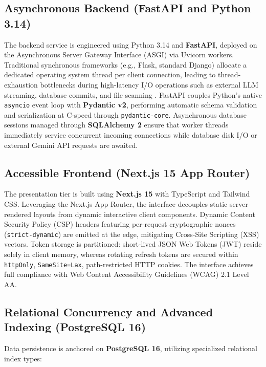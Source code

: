 \documentclass[conference]{IEEEtran}
\begin{document}
\subsection{Asynchronous Backend (FastAPI and Python 3.14)}
The backend service is engineered using Python 3.14 and \textbf{FastAPI}, deployed on the Asynchronous Server Gateway Interface (ASGI) via Uvicorn workers. Traditional synchronous frameworks (e.g., Flask, standard Django) allocate a dedicated operating system thread per client connection, leading to thread-exhaustion bottlenecks during high-latency I/O operations such as external LLM streaming, database commits, and file scanning \cite{birman2021high}. FastAPI couples Python's native \texttt{asyncio} event loop with \textbf{Pydantic v2}, performing automatic schema validation and serialization at C-speed through \texttt{pydantic-core}. Asynchronous database sessions managed through \textbf{SQLAlchemy 2} ensure that worker threads immediately service concurrent incoming connections while database disk I/O or external Gemini API requests are awaited.

\subsection{Accessible Frontend (Next.js 15 App Router)}
The presentation tier is built using \textbf{Next.js 15} with TypeScript and Tailwind CSS. Leveraging the Next.js App Router, the interface decouples static server-rendered layouts from dynamic interactive client components. Dynamic Content Security Policy (CSP) headers featuring per-request cryptographic nonces (\texttt{strict-dynamic}) are emitted at the edge, mitigating Cross-Site Scripting (XSS) vectors. Token storage is partitioned: short-lived JSON Web Tokens (JWT) reside solely in client memory, whereas rotating refresh tokens are secured within \texttt{httpOnly}, \texttt{SameSite=Lax}, path-restricted HTTP cookies. The interface achieves full compliance with Web Content Accessibility Guidelines (WCAG) 2.1 Level AA.

\subsection{Relational Concurrency and Advanced Indexing (PostgreSQL 16)}
Data persistence is anchored on \textbf{PostgreSQL 16}, utilizing specialized relational index types:
\end{document}
